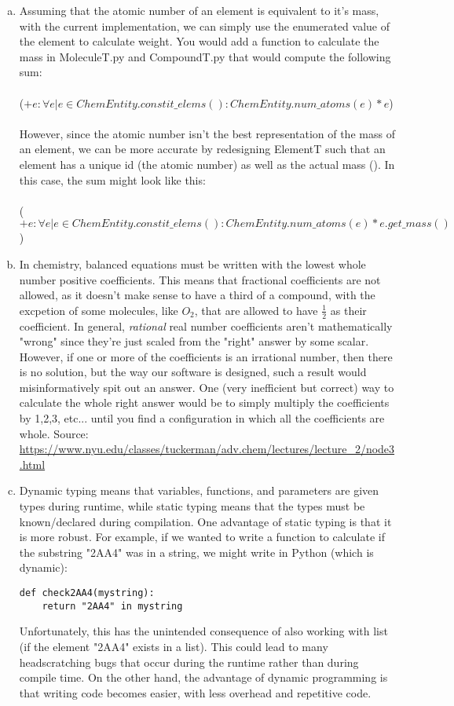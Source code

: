 \documentclass[12pt]{article}
\begin{document}
\begin{enumerate}[a)]
\item Assuming that the atomic number of an element is equivalent to it's mass, with the current implementation, we can simply use the enumerated value of the element to calculate weight. You would add a function to calculate the mass in MoleculeT.py and CompoundT.py that would compute the following sum:\\\\
($+e : \forall e | e \in ChemEntity.constit\_elems() : ChemEntity.num\_atoms(e) * e$)
\\\\
However, since the atomic number isn't the best representation of the mass of an element, we can be more accurate by redesigning ElementT such that an element has a unique id (the atomic number) as well as the actual mass (). In this case, the sum might look like this:\\\\
($+e : \forall e | e \in ChemEntity.constit\_elems() : ChemEntity.num\_atoms(e) * e.get\_mass()$)
\\

\item In chemistry, balanced equations must be written with the lowest whole number positive coefficients. This means that fractional coefficients are not allowed, as it doesn't make sense to have a third of a compound, with the excpetion of some molecules, like $O_2$, that are allowed to have $\frac{1}{2}$ as their coefficient. In general, \emph{rational} real number coefficients aren't mathematically "wrong" since they're just scaled from the "right" answer by some scalar. However, if one or more of the coefficients is an irrational number, then there is no solution, but the way our software is designed, such a result would misinformatively spit out an answer. One (very inefficient but correct) way to calculate the whole right answer would be to simply multiply the coefficients by 1,2,3, etc... until you find a configuration in which all the coefficients are whole. Source: \url{https://www.nyu.edu/classes/tuckerman/adv.chem/lectures/lecture_2/node3.html}

\item Dynamic typing means that variables, functions, and parameters are given types during runtime, while static typing means that the types must be known/declared during compilation. One advantage of static typing is that it is more robust. For example, if we wanted to write a function to calculate if the substring "2AA4" was in a string, we might write in Python (which is dynamic):
\begin{lstlisting}
def check2AA4(mystring):
    return "2AA4" in mystring
\end{lstlisting}
Unfortunately, this has the unintended consequence of also working with list (if the element "2AA4" exists in a list). This could lead to many headscratching bugs that occur during the runtime rather than during compile time. On the other hand, the advantage of dynamic programming is that writing code becomes easier, with less overhead and repetitive code.


\end{enumerate}
\end{document}
